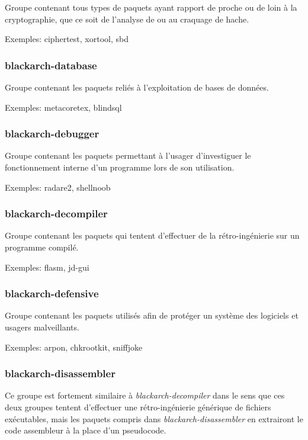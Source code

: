 \documentclass[a4paper, oneside, 11pt]{book}
\begin{document}
Groupe contenant tous types de paquets ayant rapport de proche ou de loin à la
cryptographie, que ce soit de l'analyse de ou au craquage de hache.

Exemples: ciphertest, xortool, sbd

\subsubsection{blackarch-database}

Groupe contenant les paquets reliés à l'exploitation de bases de données.

Exemples: metacoretex, blindsql

\subsubsection{blackarch-debugger}

Groupe contenant les paquets permettant à l'usager d’investiguer le
fonctionnement interne d'un programme lors de son utilisation.

Exemples: radare2, shellnoob

\subsubsection{blackarch-decompiler}

Groupe contenant les paquets qui tentent d'effectuer de la rétro-ingénierie sur
un programme compilé.

Exemples: flasm, jd-gui

\subsubsection{blackarch-defensive}

Groupe contenant les paquets utilisés afin de protéger un système des logiciels
et usagers malveillants.

Exemples: arpon, chkrootkit, sniffjoke

\subsubsection{blackarch-disassembler}

Ce groupe est fortement similaire à \textit{blackarch-decompiler} dans le sens
que ces deux groupes tentent d'effectuer une rétro-ingénierie générique de
fichiers exécutables, mais les paquets compris dans
\textit{blackarch-disassembler} en extrairont le code assembleur à la place d'un
pseudocode.
\end{document}

